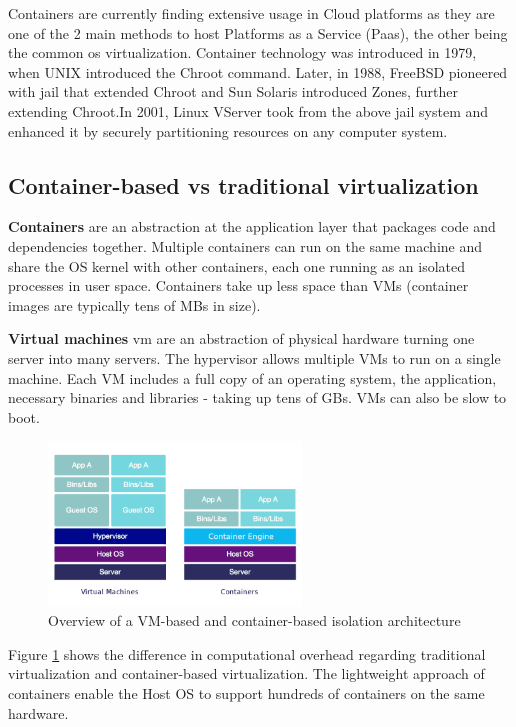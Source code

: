 Containers are currently finding extensive usage in Cloud platforms as they are one of the 2 main methods to host Platforms as a Service (Paas), the other being the common \acrfull{os} virtualization. Container technology was introduced in 1979\cite{ismail2015evaluation}, when UNIX introduced the Chroot command. Later, in 1988, FreeBSD pioneered with jail that extended Chroot and Sun Solaris introduced Zones, further extending Chroot.In 2001, Linux VServer took from the above jail system and enhanced it by securely partitioning resources on any computer system.

\subsection{Container-based vs traditional virtualization}

\textbf{Containers} are an abstraction at the application layer that packages code and dependencies together. Multiple containers can run on the same machine and share the OS kernel with other containers, each one running as an isolated processes in user space. Containers take up less space than VMs (container images are typically tens of MBs in size).

\noindent
\textbf{Virtual machines} \acrshort{vm} are an abstraction of physical hardware turning one server into many servers. The hypervisor allows multiple VMs to run on a single machine. Each VM includes a full copy of an operating system, the application, necessary binaries and libraries - taking up tens of GBs. VMs can also be slow to boot.

\begin{figure}[h]
    \centering
    \includegraphics[width=0.6\textwidth]{images/docker_arch.png}
    \caption{Overview of a VM-based and container-based isolation architecture \cite{kumina}}
    \label{fig:container}
\end{figure}

Figure \ref{fig:container} shows the difference in computational overhead regarding traditional virtualization and container-based virtualization. The lightweight approach of containers enable the Host OS to support hundreds of containers on the same hardware.

